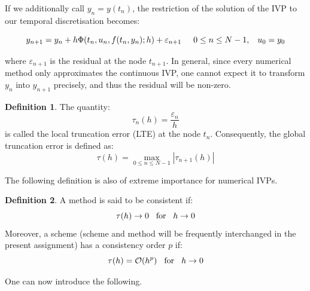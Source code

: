 \documentclass[11pt]{article}
\theoremstyle{theorem}
\theoremstyle{definition}
\newtheorem{definition}{Definition}
\begin{document}
If we additionally call $y_n=y(t_n)$, the restriction of the solution of the IVP to our
temporal discretisation becomes:

$$y_{n+1}=y_n+h\Phi(t_n,u_n,f(t_n, y_n);h)+\varepsilon_{n+1}\hspace{5mm}0\le n\le N-1,\hspace{3mm}u_0=y_0$$

where $\varepsilon_{n+1}$ is the residual at the node $t_{n+1}$. In general, since every numerical method only approximates the continuous IVP, one cannot expect it to transform $y_n$ into $y_{n+1}$ precisely, and thus the residual will be non-zero.\\

\begin{definition}
	\label{def:truncation-error}
	The quantity:
	\begin{equation}
		\label{eqn:local-truncation-error}
		\tau_n(h)=\frac{\varepsilon_n}{h}
	\end{equation}
	is called the local truncation error (LTE) at the node $t_n$. Consequently, the global truncation error is defined as:
	\begin{equation}
	\label{eqn:global-truncation-error}
	\tau(h)=\max\limits_{0\le n\le N-1}|\tau_{n+1}(h)|
	\end{equation}
\end{definition}

The following definition is also of extreme importance for numerical IVPs.

\begin{definition}
	\label{def:consistency}
	A method is said to be consistent if:
	$$\tau(h)\rightarrow 0\hspace{3mm}\text{for}\hspace{3mm}h\rightarrow 0$$
	Moreover, a scheme (scheme and method will be frequently interchanged in the present assignment) has a consistency order $p$ if:
	$$\tau(h)=\mathcal{O}(h^p)\hspace{3mm}\text{for}\hspace{3mm}h\rightarrow 0$$
\end{definition}

One can now introduce the following.
\end{document}
